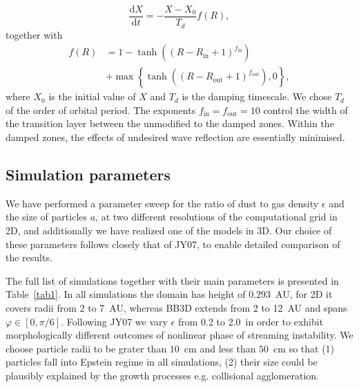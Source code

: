 \begin{equation}
  \frac{\textrm{d}X}{\textrm{d}t} = - \frac{X-X_0}{T_d}f(R),
\end{equation}
together with
\begin{equation}
   \begin{split} 
      f(R) &= 1 - \tanh\left(\left(R - R_\textrm{in} + 1
      \right)^{f_\textrm{in}}\right)\\ &+ \max\left\{ \tanh\left(\left(R -
      R_\textrm{out} + 1\right)^{f_\textrm{out}}\right), 0\right\}, 
   \end{split}
\end{equation}
where $X_0$ is the initial value of $X$ and $T_d$ is the damping timescale. We
chose $T_d$ of the order of orbital period.  The exponents
$f_\textrm{in}=f_\textrm{out}=10$ control the width of the transition layer
between the unmodified to the damped zones. Within the damped zones, the effects
of undesired wave reflection are essentially minimised.
%
\subsection{Simulation parameters}
%
We have performed a parameter sweep for the ratio of dust to gas density
$\epsilon$ and the size of particles $a$, at two different resolutions of the
computational grid in 2D, and additionally we have realized one of the models in
3D. Our choice of these parameters follows closely that of JY07, to enable
detailed comparison of the results.

The full list of simulations together with their main parameters is presented in
Table~\ref{tab1}. In all simulations the domain has height of $0.293$~AU,
for 2D it covers radii from 2 to 7~AU, whereas BB3D extends from 2 to 12~AU and
spans $\varphi\in[0, \pi/6]$.  Following JY07 we vary $\epsilon$ from 0.2 to
2.0~in order to exhibit morphologically different outcomes of nonlinear phase of
streaming instability.  We choose particle radii to be grater than $10$~cm and
less than $50$~cm so that (1) particles fall into Epstein regime in all
simulations, (2) their size could be plausibly explained by the growth processes
e.g. collisional agglomeration.

